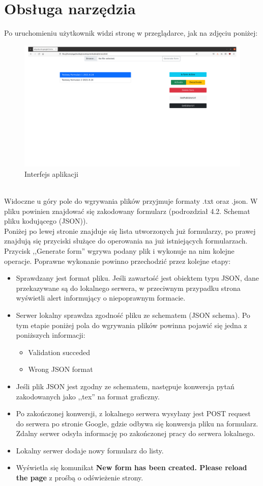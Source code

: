 \section{Obsługa narzędzia}
Po uruchomieniu użytkownik widzi stronę w przeglądarce, jak na zdjęciu poniżej:
\begin{figure}[H]
  \includegraphics[scale=0.75]{strona.png}
  \caption{Interfejs aplikacji}
  \label{fig:1}
\end{figure}
\\Widoczne u góry pole do wgrywania plików przyjmuje formaty .txt oraz .json. W pliku powinien znajdować się zakodowany formularz (podrozdział 4.2. Schemat pliku kodującego (JSON)).
\\Poniżej  po lewej stronie znajduje się lista utworzonych już formularzy, po prawej znajdują się przyciski służące do operowania na już istniejących formularzach.
\\Przycisk ,,Generate form'' wgrywa podany plik i  wykonuje na nim kolejne operacje. Poprawne wykonanie powinno przechodzić przez kolejne etapy:
\begin{itemize}
\item Sprawdzany jest format  pliku. Jeśli zawartość jest obiektem typu JSON, dane przekazywane są do lokalnego serwera, w przeciwnym przypadku strona wyświetli alert informujący o niepoprawnym formacie.
\item Serwer lokalny sprawdza zgodność pliku ze schematem (JSON schema). Po tym etapie poniżej pola do wgrywania plików powinna pojawić się jedna z poniższych informacji:
\begin{itemize}
\item Validation succeded
\item Wrong JSON format
\end{itemize}
\item Jeśli plik JSON jest zgodny ze schematem, następuje konwersja pytań zakodowanych jako ,,tex'' na format graficzny. 
\item Po zakończonej konwersji, z lokalnego serwera wysyłany jest POST request do serwera po stronie Google, gdzie odbywa się konwersja pliku na formularz. Zdalny serwer odsyła informację po zakończonej pracy do serwera lokalnego.
\item Lokalny serwer dodaje nowy formularz do listy.
\item Wyświetla się komunikat \textbf{New form has been created. Please reload the page} z prośbą o odświeżenie strony.
\end{itemize}
